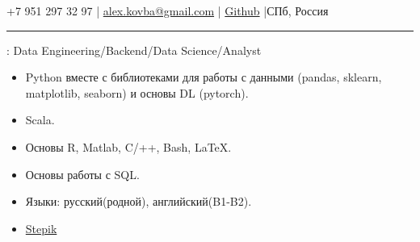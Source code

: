 \documentclass[11pt]{article}
\begin{document}

\vspace{0.5em}

\noindent +7 951 297 32 97    |   \href{mailto:alex.kovba@gmail.com}{alex.kovba@gmail.com}  | \href{https://github.com/AlexeyArcher}{Github} |СПб, Россия

\vspace{0.5em}

\hrule

\vspace{1.5em}


: Data Engineering/Backend/Data Science/Analyst


\vspace{1em}

\begin{itemize}

\item Python вместе с библиотеками для работы с данными (pandas, sklearn, matplotlib, seaborn) и основы DL (pytorch).
\item Scala.
\item Основы R, Matlab, C/++, Bash, LaTeX.
\item Основы работы с SQL.
\item Языки: русский(родной), английский(B1-B2).
\end{itemize}


\begin{itemize}

\item  \href{https://stepik.org/users/21130374}{Stepik} 

\end{itemize}
\end{document}
